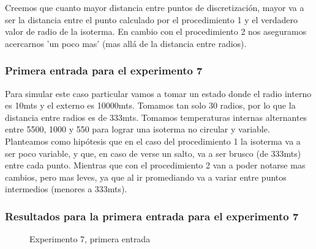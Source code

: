 \par Creemos que cuanto mayor distancia entre puntos de discretización, mayor va a ser la distancia entre el punto calculado por el procedimiento 1 y el verdadero valor de radio de la isoterma. En cambio con el procedimiento 2 nos aseguramos acercarnos 'un poco mas' (mas allá de la distancia entre radios).

\subsubsection{Primera entrada para el experimento 7}
\par Para simular este caso particular vamos a tomar un estado donde el radio interno es 10mts y el externo es 10000mts. Tomamos tan solo 30 radios, por lo que la distancia entre radios es de 333mts. Tomamos temperaturas internas alternantes entre 5500, 1000 y 550 para lograr una isoterma no circular y variable. Planteamos como hipótesis que en el caso del procedimiento 1 la isoterma va a ser poco variable, y que, en caso de verse un salto, va a ser brusco (de 333mts) entre cada punto. Mientras que con el procedimiento 2 van a poder notarse mas cambios, pero mas leves, ya que al ir promediando va a variar entre puntos intermedios (menores a 333mts).

\subsubsection{Resultados para la primera entrada para el experimento 7}

\begin{figure}[ht]
\begin{center}
\caption{Experimento 7, primera entrada}
\end{center}
\end{figure}

